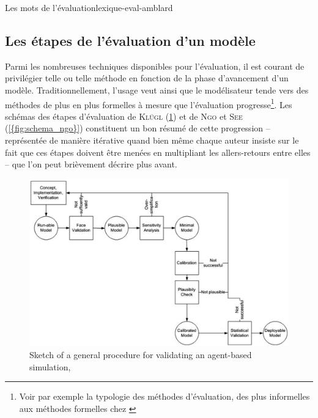 \begin{encadre}{Les mots de l'évaluation}{lexique-eval-amblard}
\end{encadre}

\clearpage

\subsection{Les étapes de l'évaluation d'un modèle}

Parmi les nombreuses techniques disponibles pour l'évaluation, il est courant de privilégier telle ou telle méthode en fonction de la phase d'avancement d'un modèle.
Traditionnellement, l'usage veut ainsi que le modélisateur tende vers des méthodes de plus en plus formelles à mesure que l'évaluation progresse\footnote{Voir par exemple la typologie des méthodes d'évaluation, des plus \og informelles \fg{} aux méthodes \og formelles \fg{} chez \cite[figure 3, p. 131]{balci_validation_1994}}.
Les schémas des étapes d'évaluation de \textsc{Klügl} (\cref{fig:schema_kluegl}) et de \textsc{Ngo} et \textsc{See} (\cref{{fig:schema_ngo}}) constituent un bon résumé de cette progression -- représentée de manière itérative quand bien même chaque auteur insiste sur le fait que ces étapes doivent être menées en multipliant les allers-retours entre elles -- que l'on peut brièvement décrire plus avant.

\begin{figure}[H]
	\center
	\includegraphics[height=.35\textheight]{img/Schema_Kluegl.png}
	\caption{\og Sketch of a general procedure for validating an agent-based simulation\fg{}, \cite[fig. 1 p. 42]{klugl_validation_2008}}
	\label{fig:schema_kluegl}
\end{figure}


